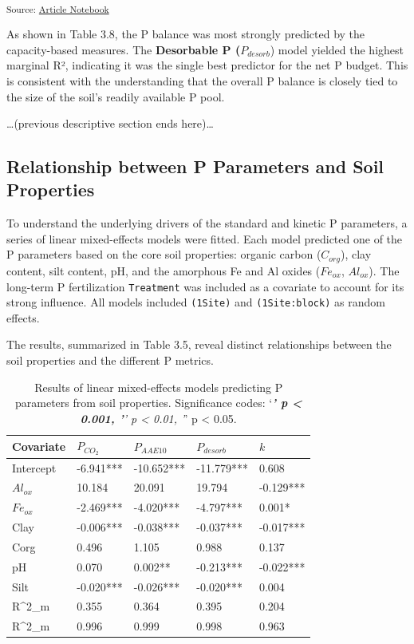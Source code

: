 \documentclass[
  a4paper,
]{article}
\begin{document}
\textsubscript{Source:
\href{https://Andrapodon.github.io/Master-Thesis-P-kinetics/index.qmd.html}{Article
Notebook}}

As shown in Table 3.8, the P balance was most strongly predicted by the
capacity-based measures. The \textbf{Desorbable P (}\(P_{desorb}\))
model yielded the highest marginal R², indicating it was the single best
predictor for the net P budget. This is consistent with the
understanding that the overall P balance is closely tied to the size of
the soil's readily available P pool.

\ldots(previous descriptive section ends here)\ldots{}

\subsection{Relationship between P Parameters and Soil
Properties}\label{relationship-between-p-parameters-and-soil-properties}

To understand the underlying drivers of the standard and kinetic P
parameters, a series of linear mixed-effects models were fitted. Each
model predicted one of the P parameters based on the core soil
properties: organic carbon (\(C_{org}\)), clay content, silt content,
pH, and the amorphous Fe and Al oxides (\(Fe_{ox}\), \(Al_{ox}\)). The
long-term P fertilization \texttt{Treatment} was included as a covariate
to account for its strong influence. All models included
\texttt{(1\textbar{}Site)} and \texttt{(1\textbar{}Site:block)} as
random effects.

The results, summarized in Table 3.5, reveal distinct relationships
between the soil properties and the different P metrics.

\begin{longtable}[]{@{}lllll@{}}

\caption{\label{tbl-soil-prop-models}Results of linear mixed-effects
models predicting P parameters from soil properties. Significance codes:
`\emph{\textbf{' p \textless{} 0.001, '}' p \textless{} 0.01, '}' p
\textless{} 0.05.}

\tabularnewline

\toprule\noalign{}
Covariate & \(P_{CO_2}\) & \(P_{AAE10}\) & \(P_{desorb}\) & \(k\) \\
\midrule\noalign{}
\endhead
\bottomrule\noalign{}
\endlastfoot
Intercept & -6.941*** & -10.652*** & -11.779*** & 0.608 \\
\(Al_{ox}\) & 10.184 & 20.091 & 19.794 & -0.129*** \\
\(Fe_{ox}\) & -2.469*** & -4.020*** & -4.797*** & 0.001* \\
Clay & -0.006*** & -0.038*** & -0.037*** & -0.017*** \\
Corg & 0.496 & 1.105 & 0.988 & 0.137 \\
pH & 0.070 & 0.002** & -0.213*** & -0.022*** \\
Silt & -0.020*** & -0.026*** & -0.020*** & 0.004 \\
R\^{}2\_m & 0.355 & 0.364 & 0.395 & 0.204 \\
R\^{}2\_m & 0.996 & 0.999 & 0.998 & 0.963 \\

\end{longtable}
\end{document}
